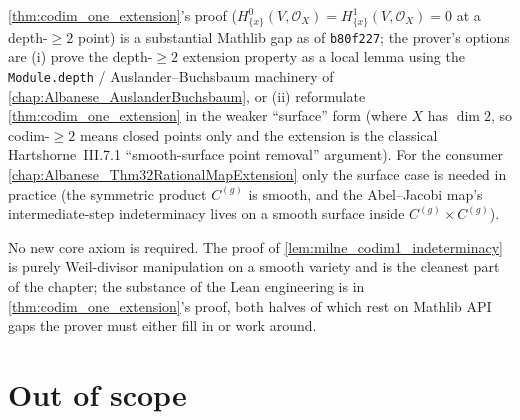 \begin{itemize}
    \cref{thm:codim_one_extension}'s proof
    (\(H^0_{\{x\}}(V, \mathcal O_X) = H^1_{\{x\}}(V, \mathcal O_X) = 0\) at a
    depth-\(\geq 2\) point) is a substantial Mathlib gap as of \texttt{b80f227}; the
    prover's options are (i) prove the depth-\(\geq 2\) extension property as a local
    lemma using the \texttt{Module.depth} / Auslander--Buchsbaum machinery of
    \cref{chap:Albanese_AuslanderBuchsbaum}, or (ii) reformulate
    \cref{thm:codim_one_extension} in the weaker ``surface'' form
    (where \(X\) has \(\dim 2\), so codim-\(\geq 2\) means closed points only and the
    extension is the classical Hartshorne~III.7.1 ``smooth-surface point removal''
    argument). For the consumer \cref{chap:Albanese_Thm32RationalMapExtension} only
    the surface case is needed in practice (the symmetric product \(C^{(g)}\) is
    smooth, and the Abel--Jacobi map's intermediate-step indeterminacy lives on a
    smooth surface inside \(C^{(g)} \times C^{(g)}\)).
\end{itemize}

No new core axiom is required. The proof of \cref{lem:milne_codim1_indeterminacy} is
purely Weil-divisor manipulation on a smooth variety and is the cleanest part of
the chapter; the substance of the Lean engineering is in
\cref{thm:codim_one_extension}'s proof, both halves of which rest on Mathlib API
gaps the prover must either fill in or work around.

\section{Out of scope}
\label{sec:codim1_out_of_scope}

